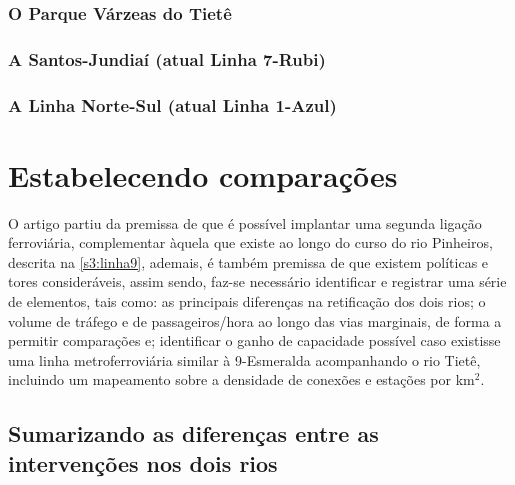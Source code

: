 \documentclass[
article,			%
11pt,				%
oneside,			%
a4paper,			%
english,			%
brazil,				%
sumario=tradicional
]{abntex2}
\begin{document}
	\subsubsection{O Parque Várzeas do Tietê} \label{s3:pvt}
	
	\subsubsection{A Santos-Jundiaí (atual Linha 7-Rubi)} \label{s3:efsj}
	
	\subsubsection{A Linha Norte-Sul (atual Linha 1-Azul)} \label{s3:nortesul}
	
	
	\section{Estabelecendo comparações} \label{s1:comparando}
	
	O artigo partiu da premissa de que é possível implantar uma segunda ligação ferroviária, complementar àquela que existe ao longo do curso do rio Pinheiros, descrita na \autoref{s3:linha9}, ademais, é também premissa de que existem políticas e tores consideráveis, assim sendo, faz-se necessário identificar e registrar uma série de elementos, tais como: as principais diferenças na retificação dos dois rios; o volume de tráfego e de passageiros/hora ao longo das vias marginais, de forma a permitir comparações e; identificar o ganho de capacidade possível caso existisse uma linha metroferroviária similar à 9-Esmeralda acompanhando o rio Tietê, incluindo um mapeamento sobre a densidade de conexões e estações por km$^{2}$.
	
	\subsection{Sumarizando as diferenças entre as intervenções nos dois rios} \label{s2:sumarizando}
	
\end{document}
